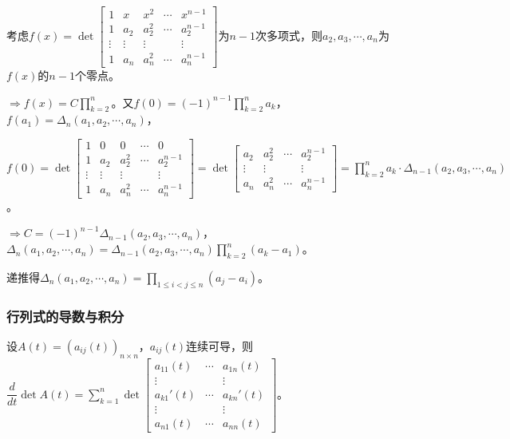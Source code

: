                 \begin{solution}
                    考虑$f(x)=\det\begin{bmatrix}1&x&x^2&\cdots&x^{n-1}\\1&a_2&a_2^2&\cdots&a_2^{n-1}\\\vdots&\vdots&\vdots&&\vdots\\1&a_n&a_n^2&\cdots&a_n^{n-1}\end{bmatrix}$为$n-1$次多项式，则$a_2,a_3,\cdots,a_n$为$f(x)$的$n-1$个零点。

                    $\Rightarrow f(x)=C\prod\limits_{k=2}^{n}$。又$f(0)=(-1)^{n-1}\prod\limits_{k=2}^n a_k$，$f(a_1)=\Delta_n(a_1,a_2,\cdots,a_n)$，

                    $f(0)=\det\begin{bmatrix}1&0&0&\cdots&0\\1&a_2&a_2^2&\cdots&a_2^{n-1}\\\vdots&\vdots&\vdots&&\vdots\\1&a_n&a_n^2&\cdots&a_n^{n-1}\end{bmatrix}=\det\begin{bmatrix}a_2&a_2^2&\cdots&a_2^{n-1}\\\vdots&\vdots&&\vdots\\a_n&a_n^2&\cdots&a_n^{n-1}\end{bmatrix}=\prod\limits_{k=2}^n a_k\cdot\Delta_{n-1}(a_2,a_3,\cdots,a_n)$。

                    $\Rightarrow C=(-1)^{n-1}\Delta_{n-1}(a_2,a_3,\cdots,a_n)$，$\Delta_n(a_1,a_2,\cdots,a_n)=\Delta_{n-1}(a_2,a_3,\cdots,a_n)\prod\limits_{k=2}^n(a_k-a_1)$。

                    递推得$\Delta_n(a_1,a_2,\cdots,a_n)=\prod\limits_{1\leq i<j\leq n}(a_j-a_i)$。
                \end{solution}

            \subsubsection{行列式的导数与积分}

                \begin{proposition}
                    \label{determinant_derivative}
                    设$A(t)=(a_{ij}(t))_{n\times n}$，$a_{ij}(t)$连续可导，则$\dfrac{d}{dt}\det A(t)=\sum\limits_{k=1}^{n}\det\begin{bmatrix}a_{11}(t)&\cdots&a_{1n}(t)\\\vdots&&\vdots\\a_{k1}'(t)&\cdots&a_{kn}'(t)\\\vdots&&\vdots\\a_{n1}(t)&\cdots&a_{nn}(t)\end{bmatrix}$。
                \end{proposition}

